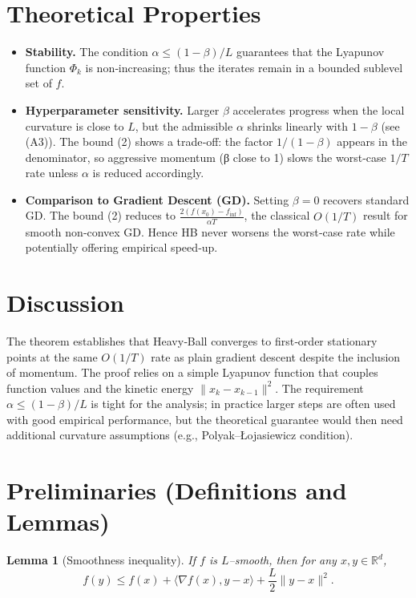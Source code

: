 \documentclass{article}
\newtheorem{lemma}{Lemma}
\newcommand{\R}{\mathbb{R}}
\begin{document}
\section*{Theoretical Properties}
\begin{itemize}
\item \textbf{Stability.} The condition $\alpha\le (1-\beta)/L$ guarantees that the Lyapunov function $\Phi_{k}$ is non‑increasing; thus the iterates remain in a bounded sublevel set of $f$.
\item \textbf{Hyperparameter sensitivity.} Larger $\beta$ accelerates progress when the local curvature is close to $L$, but the admissible $\alpha$ shrinks linearly with $1-\beta$ (see (A3)). The bound (2) shows a trade‑off: the factor $1/(1-\beta)$ appears in the denominator, so aggressive momentum (β close to 1) slows the worst‑case $1/T$ rate unless $\alpha$ is reduced accordingly.
\item \textbf{Comparison to Gradient Descent (GD).} Setting $\beta=0$ recovers standard GD. The bound (2) reduces to $\frac{2(f(x_{0})-f_{\inf})}{\alpha T}$, the classical $O(1/T)$ result for smooth non‑convex GD. Hence HB never worsens the worst‑case rate while potentially offering empirical speed‑up.
\end{itemize}

\section*{Discussion}
The theorem establishes that Heavy‑Ball converges to first‑order stationary points at the same $O(1/T)$ rate as plain gradient descent despite the inclusion of momentum. The proof relies on a simple Lyapunov function that couples function values and the kinetic energy $\|x_{k}-x_{k-1}\|^{2}$. The requirement $\alpha\le (1-\beta)/L$ is tight for the analysis; in practice larger steps are often used with good empirical performance, but the theoretical guarantee would then need additional curvature assumptions (e.g., Polyak–Łojasiewicz condition).

\newpage

\section*{Preliminaries (Definitions and Lemmas)}
\begin{lemma}[Smoothness inequality]\label{lem:smooth}
If $f$ is $L$–smooth, then for any $x,y\in\R^{d}$,
\[
f(y)\le f(x)+\langle\nabla f(x),y-x\rangle+\frac{L}{2}\|y-x\|^{2}. 
\]
\end{lemma}
\end{document}
